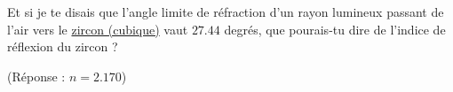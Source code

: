 

\begin{exercice}\label{exo106}
Et si je te disais que l'angle limite de réfraction d'un rayon lumineux passant de l'air vers le 
\href{http://fr.wikipedia.org/wiki/Zircon}{zircon (cubique)} vaut $27.44$ degrés, que pourais-tu dire de l'indice de réflexion du zircon ?

(Réponse : $n=2.170$)
\end{exercice}
